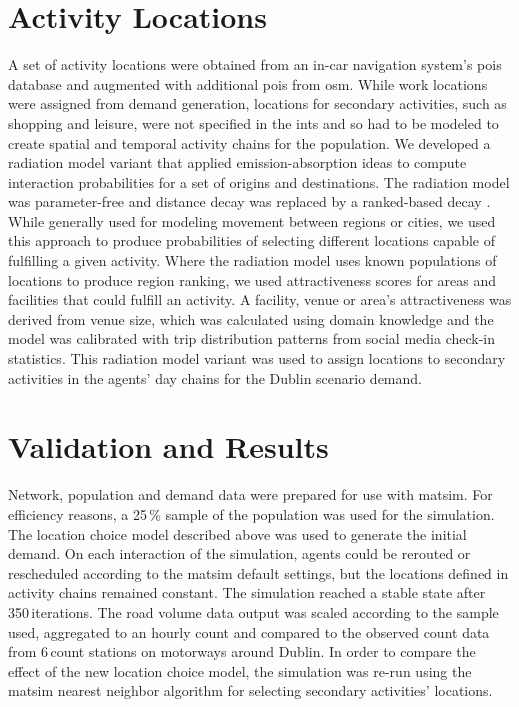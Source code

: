 \section{Activity Locations}
A set of activity locations were obtained from an in-car navigation system's \glspl{poi} database and augmented with additional \glspl{poi} from \gls{osm}. While work locations were assigned from demand generation, locations for secondary activities, such as shopping and leisure, were not specified in the \gls{ints} and so had to be modeled to create spatial and temporal activity chains for the population. We developed a radiation model variant that applied emission-absorption ideas to compute interaction probabilities for a set of origins and destinations. The radiation model was parameter-free and distance decay was replaced by a ranked-based decay \citep[][]{SiminiEtAl_NAT_2012}. While generally used for modeling movement between regions or cities, we used this approach to produce probabilities of selecting different locations capable of fulfilling a given activity. Where the radiation model uses known populations of locations to produce region ranking, we used attractiveness scores for areas and facilities that could fulfill an activity. A facility, venue or area's attractiveness was derived from venue size, which was calculated using domain knowledge and the model was calibrated with trip distribution patterns from social media check-in statistics. This radiation model variant was used to assign locations to secondary activities in the agents' day chains for the Dublin scenario demand.

\section{Validation and Results}
Network, population and demand data were prepared for use with \gls{matsim}. For efficiency reasons, a 25\,\% sample of the population was used for the simulation. The location choice model described above was used to generate the initial demand. On each interaction of the simulation, agents could be rerouted or rescheduled according to the \gls{matsim} default settings, but the locations defined in activity chains remained constant. The simulation reached a stable state after 350\,iterations. The road volume data output was scaled according to the sample used, aggregated to an hourly count and compared to the observed count data from 6\,count stations on motorways around Dublin. In order to compare the effect of the new location choice model, the simulation was re-run using the \gls{matsim} nearest neighbor algorithm for selecting secondary activities' locations.


